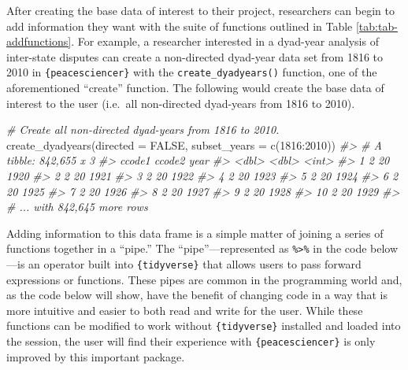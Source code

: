 \documentclass[
  11pt,
]{article}
\newenvironment{Shaded}{\begin{snugshade}}{\end{snugshade}}
\newcommand{\AttributeTok}[1]{\textcolor[rgb]{0.77,0.63,0.00}{#1}}
\newcommand{\CommentTok}[1]{\textcolor[rgb]{0.56,0.35,0.01}{\textit{#1}}}
\newcommand{\ConstantTok}[1]{\textcolor[rgb]{0.00,0.00,0.00}{#1}}
\newcommand{\DecValTok}[1]{\textcolor[rgb]{0.00,0.00,0.81}{#1}}
\newcommand{\FunctionTok}[1]{\textcolor[rgb]{0.00,0.00,0.00}{#1}}
\newcommand{\NormalTok}[1]{#1}
\newcommand{\SpecialCharTok}[1]{\textcolor[rgb]{0.00,0.00,0.00}{#1}}
\begin{document}
After creating the base data of interest to their project, researchers can begin to add information they want with the suite of functions outlined in Table \ref{tab:tab-addfunctions}. For example, a researcher interested in a dyad-year analysis of inter-state disputes can create a non-directed dyad-year data set from 1816 to 2010 in \texttt{\{peacesciencer\}} with the \texttt{create\_dyadyears()} function, one of the aforementioned ``create'' function. The following would create the base data of interest to the user (i.e.~all non-directed dyad-years from 1816 to 2010).

\begin{Shaded}
\begin{Highlighting}[]
\CommentTok{\# Create all non{-}directed dyad{-}years from 1816 to 2010.}
\FunctionTok{create\_dyadyears}\NormalTok{(}\AttributeTok{directed =} \ConstantTok{FALSE}\NormalTok{, }\AttributeTok{subset\_years =} \FunctionTok{c}\NormalTok{(}\DecValTok{1816}\SpecialCharTok{:}\DecValTok{2010}\NormalTok{))}
\CommentTok{\#\textgreater{} \# A tibble: 842,655 x 3}
\CommentTok{\#\textgreater{}    ccode1 ccode2  year}
\CommentTok{\#\textgreater{}     \textless{}dbl\textgreater{}  \textless{}dbl\textgreater{} \textless{}int\textgreater{}}
\CommentTok{\#\textgreater{}  1      2     20  1920}
\CommentTok{\#\textgreater{}  2      2     20  1921}
\CommentTok{\#\textgreater{}  3      2     20  1922}
\CommentTok{\#\textgreater{}  4      2     20  1923}
\CommentTok{\#\textgreater{}  5      2     20  1924}
\CommentTok{\#\textgreater{}  6      2     20  1925}
\CommentTok{\#\textgreater{}  7      2     20  1926}
\CommentTok{\#\textgreater{}  8      2     20  1927}
\CommentTok{\#\textgreater{}  9      2     20  1928}
\CommentTok{\#\textgreater{} 10      2     20  1929}
\CommentTok{\#\textgreater{} \# ... with 842,645 more rows}
\end{Highlighting}
\end{Shaded}

Adding information to this data frame is a simple matter of joining a series of functions together in a ``pipe.'' The ``pipe''---represented as \texttt{\%\textgreater{}\%} in the code below---is an operator built into \texttt{\{tidyverse\}} that allows users to pass forward expressions or functions. These pipes are common in the programming world and, as the code below will show, have the benefit of changing code in a way that is more intuitive and easier to both read and write for the user. While these functions can be modified to work without \texttt{\{tidyverse\}} installed and loaded into the session, the user will find their experience with \texttt{\{peacesciencer\}} is only improved by this important package.
\end{document}
